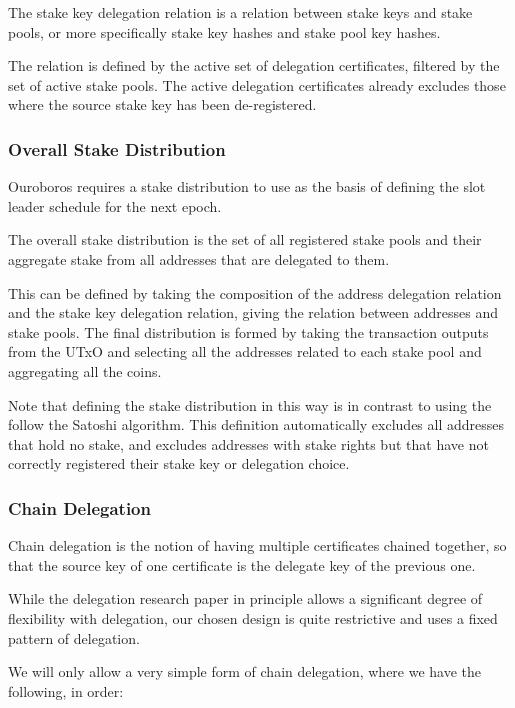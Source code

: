 \documentclass[11pt,a4paper]{article}
\begin{document}
The stake key delegation relation is a relation between stake keys and
stake pools, or more specifically stake key hashes and stake pool key
hashes.

The relation is defined by the active set of delegation certificates,
filtered by the set of active stake pools. The active delegation
certificates already excludes those where the source stake key has
been de-registered.

\subsubsection{Overall Stake Distribution}
\label{overall-stake-distribution}

Ouroboros \citep{ouroboros_classic} requires a stake distribution to
use as the basis of defining the slot leader schedule for the next
epoch.

The overall stake distribution is the set of all registered stake pools
and their aggregate stake from all addresses that are delegated to them.

This can be defined by taking the composition of the address delegation
relation and the stake key delegation relation, giving the relation
between addresses and stake pools. The final distribution is formed by
taking the transaction outputs from the UTxO and selecting all the
addresses related to each stake pool and aggregating all the coins.

Note that defining the stake distribution in this way is in contrast to
using the follow the Satoshi algorithm. This definition automatically
excludes all addresses that hold no stake, and excludes addresses with
stake rights but that have not correctly registered their stake key or
delegation choice.

\subsubsection{Chain Delegation}
\label{chain-delegation}

Chain delegation is the notion of having multiple certificates chained
together, so that the source key of one certificate is the delegate key
of the previous one.

While the delegation research paper in principle allows a significant
degree of flexibility with delegation, our chosen design is quite
restrictive and uses a fixed pattern of delegation.

We will only allow a very simple form of chain delegation, where we have
the following, in order:
\end{document}
